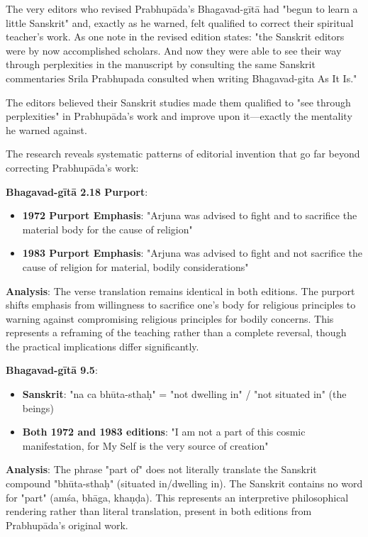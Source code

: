 \documentclass[12pt,twoside]{book}
\begin{document}
The very editors who revised Prabhupāda's Bhagavad-gītā had "begun to learn a little Sanskrit" and, exactly as he warned, felt qualified to correct their spiritual teacher's work. As one note in the revised edition states: "the Sanskrit editors were by now accomplished scholars. And now they were able to see their way through perplexities in the manuscript by consulting the same Sanskrit commentaries Srila Prabhupada consulted when writing Bhagavad-gita As It Is."

The editors believed their Sanskrit studies made them qualified to "see through perplexities" in Prabhupāda's work and improve upon it—exactly the mentality he warned against.


The research reveals systematic patterns of editorial invention that go far beyond correcting Prabhupāda's work:

\textbf{\textbf{Bhagavad-gītā 2.18 Purport}}:
\begin{itemize}
\item \textbf{\textbf{1972 Purport Emphasis}}: "Arjuna was advised to fight and to sacrifice the material body for the cause of religion"
\item \textbf{\textbf{1983 Purport Emphasis}}: "Arjuna was advised to fight and not sacrifice the cause of religion for material, bodily considerations"
\end{itemize}

\textbf{\textbf{Analysis}}: The verse translation remains identical in both editions. The purport shifts emphasis from willingness to sacrifice one's body for religious principles to warning against compromising religious principles for bodily concerns. This represents a reframing of the teaching rather than a complete reversal, though the practical implications differ significantly.

\textbf{\textbf{Bhagavad-gītā 9.5}}:
\begin{itemize}
\item \textbf{\textbf{Sanskrit}}: "na ca bhūta-sthaḥ" = "not dwelling in" / "not situated in" (the beings)
\item \textbf{\textbf{Both 1972 and 1983 editions}}: "I am not a part of this cosmic manifestation, for My Self is the very source of creation"
\end{itemize}

\textbf{\textbf{Analysis}}: The phrase "part of" does not literally translate the Sanskrit compound "bhūta-sthaḥ" (situated in/dwelling in). The Sanskrit contains no word for "part" (amśa, bhāga, khaṇḍa). This represents an interpretive philosophical rendering rather than literal translation, present in both editions from Prabhupāda's original work.
\end{document}

